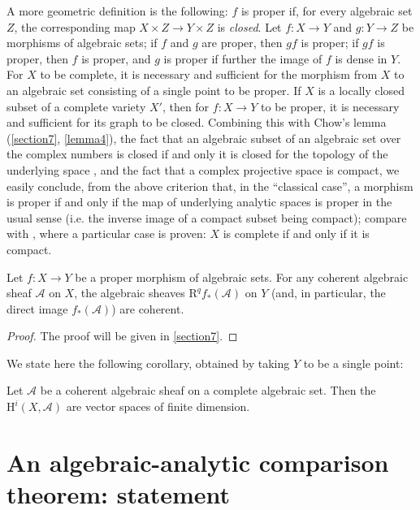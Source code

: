 \documentclass{article}
\theoremstyle{plain}
\newenvironment{theorem}[1]
  {\renewcommand\theinnercustomtheorem{#1}\innercustomtheorem}
  {\endinnercustomtheorem}
\newenvironment{corollary}[1]
  {\renewcommand\theinnercustomcorollary{#1}\innercustomcorollary}
  {\endinnercustomcorollary}
\theoremstyle{definition}
\newcommand{\sh}{\mathscr}
\newcommand{\HH}{\mathrm{H}}
\newcommand{\RR}{\mathrm{R}}
\newcommand{\oldpage}[1]{\marginpar{\footnotesize$\Big\vert$ \textit{p.~#1}}}
\begin{document}
A more geometric definition is the following: $f$ is proper if, for every algebraic set $Z$, the corresponding map $X\times Z\to Y\times Z$ is \emph{closed}.
Let $f\colon X\to Y$ and $g\colon Y\to Z$ be morphisms of algebraic sets;
if $f$ and $g$ are proper, then $gf$ is proper;
if $gf$ is proper, then $f$ is proper, and $g$ is proper if further the image of $f$ is dense in $Y$.
For $X$ to be complete, it is necessary and sufficient for the morphism from $X$ to an algebraic set consisting of a single point to be proper.
If $X$ is a locally closed subset of a complete variety $X'$, then for $f\colon X\to Y$ to be proper, it is necessary and sufficient for its graph to be closed.
Combining this with Chow's lemma (\cref{section7}, \cref{lemma4}), the fact that an algebraic subset of an algebraic set over the complex numbers is closed if and only it is closed for the topology of the underlying space \cite[proposition~7, page~12]{2}, and the fact that a complex projective space is compact, we easily conclude, from the
\oldpage{2-08}
above criterion that, in the ``classical case'', a morphism is proper if and only if the map of underlying analytic spaces is proper in the usual sense (i.e. the inverse image of a compact subset being compact);
compare with \cite[proposition~12, proposition~6]{2}, where a particular case is proven: $X$ is complete if and only if it is compact.

\begin{theorem}{4}
\label{theorem4}
  Let $f\colon X\to Y$ be a proper morphism of algebraic sets.
  For any coherent algebraic sheaf $\sh{A}$ on $X$, the algebraic sheaves $\RR^qf_*(\sh{A})$ on $Y$ (and, in particular, the direct image $f_*(\sh{A})$) are coherent.
\end{theorem}

\begin{proof}
  The proof will be given in \cref{section7}.
\end{proof}

We state here the following corollary, obtained by taking $Y$ to be a single point:

\begin{corollary}{1}
  Let $\sh{A}$ be a coherent algebraic sheaf on a complete algebraic set.
  Then the $\HH^i(X,\sh{A})$ are vector spaces of finite dimension.
\end{corollary}


\section{An algebraic-analytic comparison theorem: statement}
\label{section6}
\end{document}
